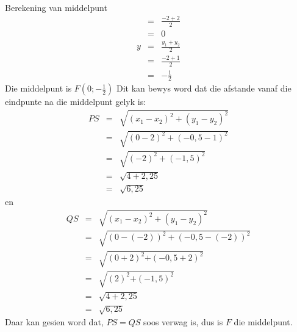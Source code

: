 \begin{wex}{Berekening van middelpunt}
{\begin{eqnarray*}
& = & \frac{-2 + 2}{2} \\ 
& = & 0 \\ 
y & = & \frac{{y}_{1} + {y}_{2}}{2} \\ 
& = & \frac{-2 + 1}{2} \\ 
& = & -\frac{1}{2} 
\end{eqnarray*}
Die middelpunt is $F(0;-\frac{1}{2})$
Dit kan bewys word dat die afstande vanaf die eindpunte na die middelpunt gelyk is: 
\begin{eqnarray*}
PS & = & \sqrt{{({x}_{1} - {x}_{2})}^{2} + {({y}_{1} - {y}_{2})}^{2}} \\ 
& = & \sqrt{{(0 - 2)}^{2} + {(-0,5 - 1)}^{2}} \\ 
& = & \sqrt{{(-2)}^{2} + {(-1,5)}^{2}} \\ 
& = & \sqrt{4 + 2,25} \\ 
& = & \sqrt{6,25}
\end{eqnarray*}
en
\begin{eqnarray*}
QS & = & \sqrt{{({x}_{1} - {x}_{2})}^{2} + {({y}_{1} - {y}_{2})}^{2}} \\ 
& = & \sqrt{{(0 - (-2))}^{2} + {(-0,5 - (-2))}^{2}} \\ 
& = & \sqrt{{(0 + 2)}^{2}{+(-0,5 + 2)}^{2}} \\ 
& = & \sqrt{{(2)}^{2}{+(-1,5)}^{2}} \\ 
& = & \sqrt{4 + 2,25} \\ 
& = & \sqrt{6,25}
\end{eqnarray*}
Daar kan gesien word dat, $PS=QS$ soos verwag is, dus is $F$ die middelpunt. 
}
\end{wex}

